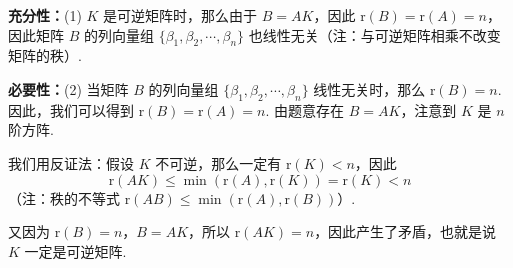 \documentclass[a4paper,11pt]{ctexart}
\newcommand{\rk}{\mathrm{r}}
\begin{document}
\textbf{充分性：}(1) $K$ 是可逆矩阵时，那么由于 $B = AK$，因此 $\rk(B) = \rk(A) = n$，因此矩阵 $B$ 的列向量组 $\{\beta_1, \beta_2, \cdots, \beta_n\}$ 也线性无关（注：与可逆矩阵相乘不改变矩阵的秩）.

\textbf{必要性：}(2) 当矩阵 $B$ 的列向量组 $\{\beta_1, \beta_2, \cdots, \beta_n\}$ 线性无关时，那么 $\rk(B) = n$. 因此，我们可以得到 $\rk(B) = \rk(A) = n$. 由题意存在 $B = AK$，注意到 $K$ 是 $n$ 阶方阵.

我们用反证法：假设 $K$ 不可逆，那么一定有 $\rk(K) < n$，因此
\[
  \rk(AK) \leqslant \min(\rk(A), \rk(K)) = \rk(K) < n
\]
（注：秩的不等式 $\rk(AB) \leqslant \min(\rk(A), \rk(B))$）.

又因为 $\rk(B) = n$，$B = AK$，所以 $\rk(AK) = n$，因此产生了矛盾，也就是说 $K$ 一定是可逆矩阵.
\end{document}

